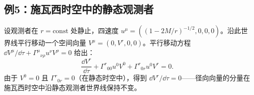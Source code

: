 \subsection{例5：施瓦西时空中的静态观测者}

设观测者在 $r = \text{const}$ 处静止，四速度 $u^\mu = ((1-2M/r)^{-1/2}, 0, 0, 0)$。沿此世界线平行移动一个空间向量 $V^\mu = (0, V^r, 0, 0)$。平行移动方程 $\dd V^\mu/\dd\tau + \Gamma^\mu{}_{\nu\rho} u^\nu V^\rho = 0$ 给出：
\begin{equation}
    \frac{\dd V^r}{\dd\tau} + \Gamma^r{}_{00} u^0 V^0 + \Gamma^r{}_{0r} u^0 V^r = 0.
\end{equation}
由于 $V^0=0$ 且 $\Gamma^r{}_{0r}=0$（在静态时空中），得到 $\dd V^r/\dd\tau = 0$——径向向量的分量在施瓦西时空中沿静态观测者世界线保持不变。

